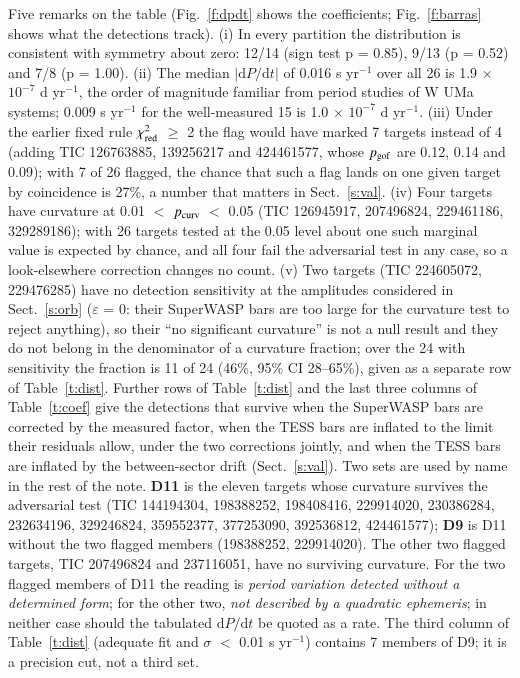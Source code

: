 \documentclass{aa}
\begin{document}
Five remarks on the table (Fig.~\ref{f:dpdt} shows the coefficients; Fig.~\ref{f:barras} shows what the detections track). (i) In every partition the distribution is consistent with symmetry about zero: 12/14 (sign test p = 0.85), 9/13 (p = 0.52) and 7/8 (p = 1.00). (ii) The median $|\mathrm{d}P/\mathrm{d}t|$ of 0.016 s yr$^{-1}$ over all 26 is 1.9 $\times$ $10^{-7}$ d yr$^{-1}$, the order of magnitude familiar from period studies of W UMa systems; 0.009 s yr$^{-1}$ for the well-measured 15 is 1.0 $\times$ $10^{-7}$ d yr$^{-1}$. (iii) Under the earlier fixed rule $\chi^2_{\rm red}$ $\ge$ 2 the flag would have marked 7 targets instead of 4 (adding TIC 126763885, 139256217 and 424461577, whose $p_{\rm gof}$ are 0.12, 0.14 and 0.09); with 7 of 26 flagged, the chance that such a flag lands on one given target by coincidence is 27\%, a number that matters in Sect.~\ref{s:val}. (iv) Four targets have curvature at 0.01 $<$ $p_{\rm curv}$ $<$ 0.05 (TIC 126945917, 207496824, 229461186, 329289186); with 26 targets tested at the 0.05 level about one such marginal value is expected by chance, and all four fail the adversarial test in any case, so a look-elsewhere correction changes no count. (v) Two targets (TIC 224605072, 229476285) have no detection sensitivity at the amplitudes considered in Sect.~\ref{s:orb} ($\varepsilon$ = 0: their SuperWASP bars are too large for the curvature test to reject anything), so their ``no significant curvature'' is not a null result and they do not belong in the denominator of a curvature fraction; over the 24 with sensitivity the fraction is 11 of 24 (46\%, 95\% CI 28--65\%), given as a separate row of Table~\ref{t:dist}. Further rows of Table~\ref{t:dist} and the last three columns of Table~\ref{t:coef} give the detections that survive when the SuperWASP bars are corrected by the measured factor, when the TESS bars are inflated to the limit their residuals allow, under the two corrections jointly, and when the TESS bars are inflated by the between-sector drift (Sect.~\ref{s:val}).
Two sets are used by name in the rest of the note. \textbf{D11} is the eleven targets whose curvature survives the adversarial test (TIC 144194304, 198388252, 198408416, 229914020, 230386284, 232634196, 329246824, 359552377, 377253090, 392536812, 424461577); \textbf{D9} is D11 without the two flagged members (198388252, 229914020). The other two flagged targets, TIC 207496824 and 237116051, have no surviving curvature. For the two flagged members of D11 the reading is \emph{period variation detected without a determined form}; for the other two, \emph{not described by a quadratic ephemeris}; in neither case should the tabulated $\mathrm{d}P/\mathrm{d}t$ be quoted as a rate. The third column of Table~\ref{t:dist} (adequate fit and $\sigma$ $<$ 0.01 s yr$^{-1}$) contains 7 members of D9; it is a precision cut, not a third set.
\end{document}
